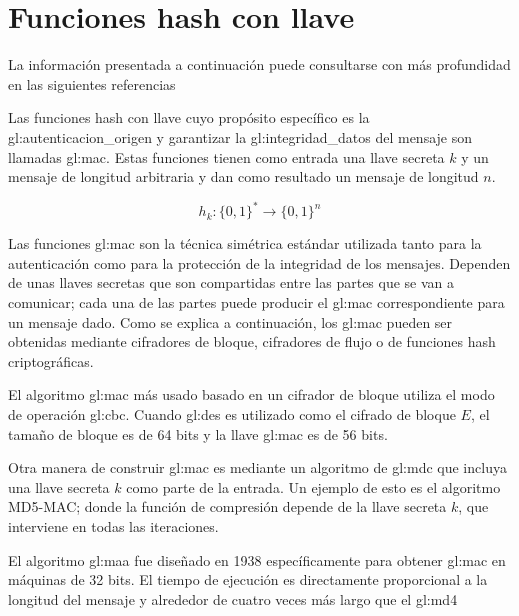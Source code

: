 %
%

\section{Funciones hash con llave}
La información presentada a continuación puede consultarse con más profundidad
en las siguientes referencias
\cite{DBLP:series/isc/DelfsK07, menezes, mac_patel}

Las funciones hash con llave cuyo propósito específico es la
\gls{gl:autenticacion_origen} y garantizar la \gls{gl:integridad_datos} del
mensaje son llamadas \acrlong{gl:mac}. Estas funciones tienen como entrada
una llave secreta $k$ y un mensaje de longitud arbitraria y dan como resultado
un mensaje de longitud $n$.

\begin{equation}
  \label{funcion_hash_mac}
  h_k: \{0, 1\}^* \longrightarrow \{0,1\}^n
\end{equation}

Las funciones \acrshort{gl:mac} son la técnica simétrica
estándar utilizada tanto para la autenticación como para la protección de la
integridad de los mensajes. Dependen de unas llaves secretas que son
compartidas entre las partes que se van a comunicar; cada una de las
partes puede producir el \acrshort{gl:mac} correspondiente para un mensaje
dado. Como se explica a continuación, los \acrshort{gl:mac} pueden ser
obtenidas mediante cifradores de bloque, cifradores de flujo o de funciones
hash criptográficas.

El algoritmo \acrshort{gl:mac} más usado basado en un cifrador de bloque
utiliza el modo de operación \acrshort{gl:cbc}. Cuando \acrshort{gl:des}
es utilizado como el cifrado de bloque $E$, el tamaño de bloque es de 64
bits y la llave \acrshort{gl:mac} es de 56 bits.

Otra manera de construir \acrshort{gl:mac} es mediante un algoritmo
de \acrshort{gl:mdc} que incluya una llave secreta $k$ como parte de la
entrada. Un ejemplo de esto es el algoritmo MD5-MAC; donde la función de
compresión depende de la llave secreta $k$, que interviene en todas las
iteraciones.

El algoritmo \acrshort{gl:maa} fue diseñado en 1938 específicamente para
obtener \acrshort{gl:mac} en máquinas de 32 bits. El tiempo de ejecución
es directamente proporcional a la longitud del mensaje y alrededor de cuatro
veces más largo que el \acrshort{gl:md4}
